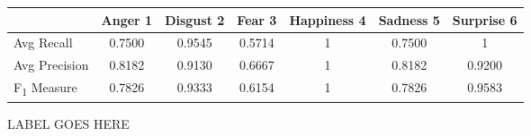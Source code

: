 \begin{figure}[h]
\begin{center}
\begin{tabular}{ | l || c | c | c | c | c | c | }
    \hline
          & Anger 1 & Disgust 2 & Fear 3 & Happiness 4 & Sadness 5 & Surprise 6 \\ \hline \hline
        Avg Recall & 0.7500 & 0.9545 & 0.5714 & 1 & 0.7500 & 1 \\ \hline
        Avg Precision & 0.8182 & 0.9130 & 0.6667 & 1 & 0.8182 & 0.9200 \\ \hline
        F\textsubscript{1} Measure & 0.7826 & 0.9333 & 0.6154 & 1 & 0.7826 &
        0.9583 \\ \hline
    \end{tabular}
    \caption{LABEL GOES HERE}
    \label{fig:averageRecall}
\end{center}
\end{figure}
